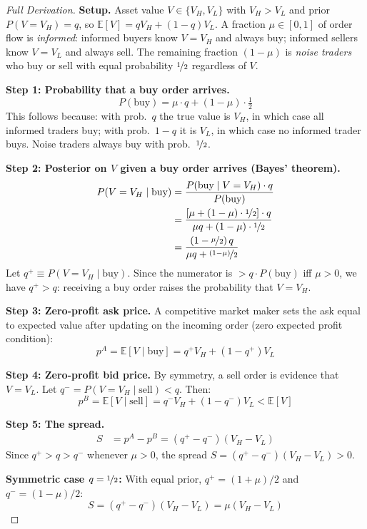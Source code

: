 \documentclass[12pt,a4paper,openany]{report}
\theoremstyle{definition}
\newcommand{\E}{\mathbb{E}}
\begin{document}
\begin{proof}[Full Derivation]
\textbf{Setup.} Asset value $V \in \{V_H, V_L\}$ with $V_H > V_L$ and prior $P(V = V_H) = q$, so $\E[V] = qV_H + (1-q)V_L$. A fraction $\mu \in [0,1]$ of order flow is \emph{informed}: informed buyers know $V = V_H$ and always buy; informed sellers know $V = V_L$ and always sell. The remaining fraction $(1-\mu)$ is \emph{noise traders} who buy or sell with equal probability $\nicefrac{1}{2}$ regardless of $V$.

\textbf{Step 1: Probability that a buy order arrives.}
\[
  P(\text{buy}) = \mu \cdot q + (1-\mu) \cdot \tfrac{1}{2}
\]
This follows because: with prob.\ $q$ the true value is $V_H$, in which case all informed traders buy; with prob.\ $1-q$ it is $V_L$, in which case no informed trader buys. Noise traders always buy with prob.\ $\nicefrac{1}{2}$.

\textbf{Step 2: Posterior on $V$ given a buy order arrives (Bayes' theorem).}
\begin{align}
  P(V=V_H \mid \text{buy}) &= \frac{P(\text{buy} \mid V=V_H)\cdot q}{P(\text{buy})} \\
  &= \frac{[\mu + (1-\mu)\cdot\nicefrac{1}{2}] \cdot q}{\mu q + (1-\mu)\cdot\nicefrac{1}{2}} \\
  &= \frac{(1 - \nicefrac{\mu}{2})\,q}{\mu q + \nicefrac{(1-\mu)}{2}}
\end{align}
Let $q^+ \equiv P(V=V_H \mid \text{buy})$. Since the numerator is $> q \cdot P(\text{buy})$ iff $\mu > 0$, we have $q^+ > q$: receiving a buy order raises the probability that $V = V_H$.

\textbf{Step 3: Zero-profit ask price.}
A competitive market maker sets the ask equal to expected value after updating on the incoming order (zero expected profit condition):
\[
  p^A = \E[V \mid \text{buy}] = q^+ V_H + (1 - q^+) V_L
\]

\textbf{Step 4: Zero-profit bid price.} By symmetry, a sell order is evidence that $V = V_L$. Let $q^- = P(V=V_H \mid \text{sell}) < q$. Then:
\[
  p^B = \E[V \mid \text{sell}] = q^- V_H + (1 - q^-) V_L < \E[V]
\]

\textbf{Step 5: The spread.}
\begin{align}
  S &= p^A - p^B = (q^+ - q^-)(V_H - V_L)
\end{align}
Since $q^+ > q > q^-$ whenever $\mu > 0$, the spread $S = (q^+ - q^-)(V_H - V_L) > 0$.

\textbf{Symmetric case $q = \nicefrac{1}{2}$:} With equal prior, $q^+ = (1+\mu)/2$ and $q^- = (1-\mu)/2$:
\[
  \boxed{S = (q^+ - q^-)(V_H - V_L) = \mu(V_H - V_L)}
\]


\end{proof}
\end{document}
